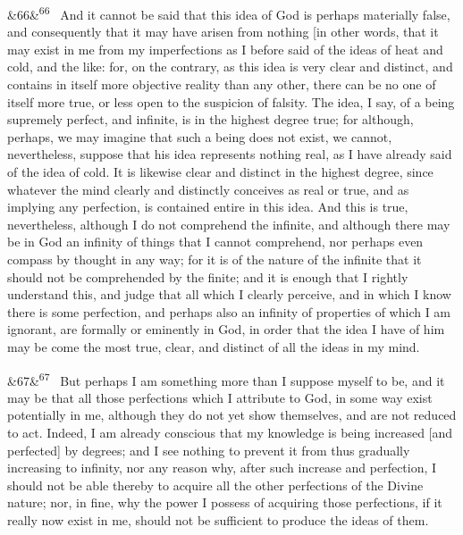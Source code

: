 \documentclass[12pt]{article}
\newcommand{\para}[1][]{\par\noindent\ifx&#1&\else\textsuperscript{\footnotesize #1}~\fi}
\begin{document}
\para[66] And it cannot be said that this idea of God is perhaps materially false, and consequently that it may have arisen from nothing [in other words, that it may exist in me from my imperfections as I before said of the ideas of heat and cold, and the like: for, on the contrary, as this idea is very clear and distinct, and contains in itself more objective reality than any other, there can be no one of itself more true, or less open to the suspicion of falsity. The idea, I say, of a being supremely perfect, and infinite, is in the highest degree true; for although, perhaps, we may imagine that such a being does not exist, we cannot, nevertheless, suppose that his idea represents nothing real, as I have already said of the idea of cold. It is likewise clear and distinct in the highest degree, since whatever the mind clearly and distinctly conceives as real or true, and as implying any perfection, is contained entire in this idea. And this is true, nevertheless, although I do not comprehend the infinite, and although there may be in God an infinity of things that I cannot comprehend, nor perhaps even compass by thought in any way; for it is of the nature of the infinite that it should not be comprehended by the finite; and it is enough that I rightly understand this, and judge that all which I clearly perceive, and in which I know there is some perfection, and perhaps also an infinity of properties of which I am ignorant, are formally or eminently in God, in order that the idea I have of him may be come the most true, clear, and distinct of all the ideas in my mind.

\para[67] But perhaps I am something more than I suppose myself to be, and it may be that all those perfections which I attribute to God, in some way exist potentially in me, although they do not yet show themselves, and are not reduced to act. Indeed, I am already conscious that my knowledge is being increased [and perfected] by degrees; and I see nothing to prevent it from thus gradually increasing to infinity, nor any reason why, after such increase and perfection, I should not be able thereby to acquire all the other perfections of the Divine nature; nor, in fine, why the power I possess of acquiring those perfections, if it really now exist in me, should not be sufficient to produce the ideas of them.
\end{document}
